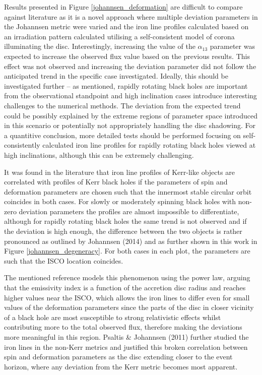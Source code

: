\documentclass[fleqn,usenatbib,useAMS]{mnras}
\begin{document}
Results presented in Figure \ref{johannsen_deformation} are difficult to compare against literature as it is a novel approach where multiple deviation parameters in the Johannsen metric were varied and the iron line profiles calculated based on an irradiation pattern calculated utilising a self-consistent model of corona illuminating the disc.
Interestingly, increasing the value of the $\alpha_{13}$ parameter was expected to increase the observed flux value based on the previous results. This effect was not observed and increasing the deviation parameter did not follow the anticipated trend in the specific case investigated. Ideally, this should be investigated further -- as mentioned, rapidly rotating black holes are important from the observational standpoint and high inclination cases introduce interesting challenges to the numerical methods. The deviation from the expected trend could be possibly explained by the extreme regions of parameter space introduced in this scenario or potentially not appropriately handling the disc shadowing. For a quantitive conclusion, more detailed tests should be performed focusing on self-consistently calculated iron line profiles for rapidly rotating black holes viewed at high inclinations, although this can be extremely challenging.


It was found in the literature that iron line profiles of Kerr-like objects are correlated with profiles of Kerr black holes if the parameters of spin and deformation parameters are chosen such that the innermost stable circular orbit coincides in both cases. For slowly or moderately spinning black holes with non-zero deviation parameters the profiles are almost impossible to differentiate, although for rapidly rotating black holes the same trend is not observed and if the deviation is high enough, the difference between the two objects is rather pronounced as outlined by Johannsen (2014) \cite{johannsen2014x} and as further shown in this work in Figure \ref{johannsen_degeneracy}. For both cases in each plot, the parameters are such that the ISCO location coincides.

The mentioned reference models this phenomenon using the power law, arguing that the emissivity index is a function of the accretion disc radius and reaches higher values near the ISCO, which allows the iron lines to differ even for small values of the deformation parameters since the parts of the disc in closer vicinity of a black hole are most susceptible to strong relativistic effects whilst contributing more to the total observed flux, therefore making the deviations more meaningful in this region. Psaltis \& Johannsen (2011) \cite{psaltis2011ray} further studied the iron lines in the non-Kerr metrics and justified this broken correlation between spin and deformation parameters as the disc extending closer to the event horizon, where any deviation from the Kerr metric becomes most apparent.
\end{document}
